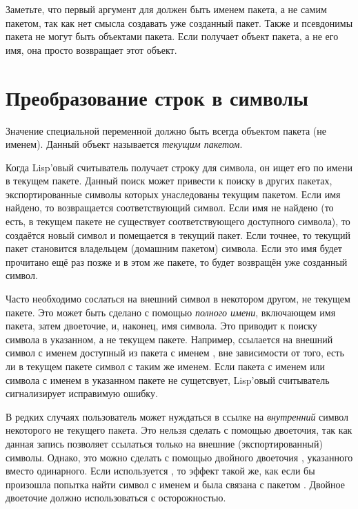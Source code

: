 Заметьте, что первый аргумент для  должен быть
именем пакета, а не самим пакетом, так как нет смысла создавать уже
созданный пакет. Также и псевдонимы пакета не могут быть объектами
пакета. Если  получает объект пакета, а не его имя,
она просто возвращает этот объект.

\section{Преобразование строк в символы}
\label{STRING-TO-SYMBOL-SECTION}

Значение специальной переменной  должно быть всегда объектом
пакета (не именем). Данный объект называется \emph{текущим пакетом}.

Когда Lisp'овый считыватель получает строку для символа, он ищет его
по имени в текущем пакете.  Данный поиск может привести к поиску в
других пакетах, экспортированные символы которых унаследованы текущим
пакетом. Если имя найдено, то возвращается соответствующий
символ. Если имя не найдено (то есть, в текущем пакете не существует
соответствующего доступного символа), то создаётся новый символ и
помещается в текущий пакет. Если точнее, то текущий пакет становится
владельцем (домашним пакетом) символа.  Если это имя будет прочитано
ещё раз позже и в этом же пакете, то будет возвращён уже созданный
символ.

Часто необходимо сослаться на внешний символ в некотором другом, не текущем
пакете. Это может быть сделано с помощью \emph{полного имени}, включающем имя
пакета, затем двоеточие, и, наконец, имя символа. Это приводит к поиску символа
в указанном, а не текущем пакете. Например,  ссылается на
внешний символ с именем  доступный из пакета с именем ,
вне зависимости от того, есть ли в текущем пакете символ с таким же именем.
Если пакета с именем  или символа с именем  в указанном
пакете не сущетсвует, Lisp'овый считыватель сигнализирует исправимую ошибку.

В редких случаях пользователь может нуждаться в ссылке на
\emph{внутренний} символ некоторого не текущего пакета. Это нельзя
сделать с помощью двоеточия, так как данная запись позволяет ссылаться
только на внешние (экспортированный) символы. Однако, это можно
сделать с помощью двойного двоеточия \cd{::}, указанного вместо
одинарного. Если используется , то эффект такой же,
как если бы произошла попытка найти символ с именем  и
 была связана с пакетом . Двойное
двоеточие должно использоваться с осторожностью.


